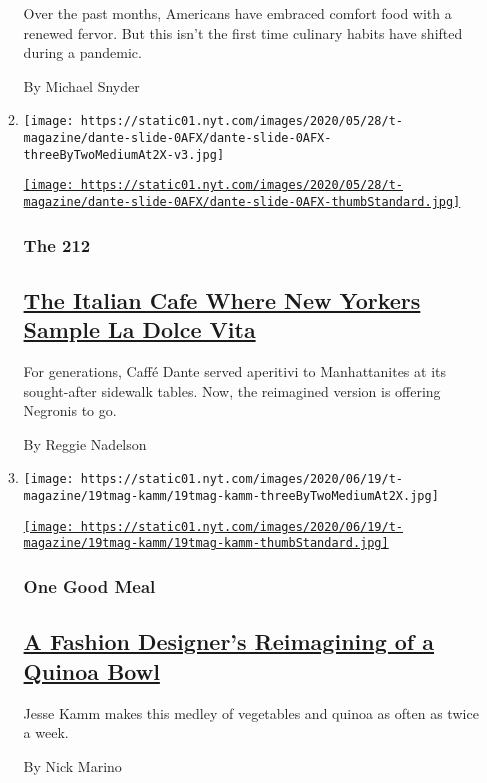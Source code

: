 \begin{enumerate}
\begin{enumerate}
    Over the past months, Americans have embraced comfort food with a
    renewed fervor. But this isn't the first time culinary habits have
    shifted during a pandemic.

    By Michael Snyder
  \item
    \texttt{[image: https://static01.nyt.com/images/2020/05/28/t-magazine/dante-slide-0AFX/dante-slide-0AFX-threeByTwoMediumAt2X-v3.jpg]}

    \href{/2020/06/12/t-magazine/caffe-dante-nyc.html}{\texttt{[image: https://static01.nyt.com/images/2020/05/28/t-magazine/dante-slide-0AFX/dante-slide-0AFX-thumbStandard.jpg]}}

    \hypertarget{the-212}{%
    \subsubsection{The 212}\label{the-212}}

    \hypertarget{the-italian-cafe-where-new-yorkers-sample-la-dolce-vita}{%
    \subsection{\texorpdfstring{\href{/2020/06/12/t-magazine/caffe-dante-nyc.html}{The
    Italian Cafe Where New Yorkers Sample La Dolce
    Vita}}{The Italian Cafe Where New Yorkers Sample La Dolce Vita}}\label{the-italian-cafe-where-new-yorkers-sample-la-dolce-vita}}

    For generations, Caffé Dante served aperitivi to Manhattanites at
    its sought-after sidewalk tables. Now, the reimagined version is
    offering Negronis to go.

    By Reggie Nadelson
  \item
    \texttt{[image: https://static01.nyt.com/images/2020/06/19/t-magazine/19tmag-kamm/19tmag-kamm-threeByTwoMediumAt2X.jpg]}

    \href{/2020/06/26/t-magazine/jesse-kamm-quinoa-bowl-recipe.html}{\texttt{[image: https://static01.nyt.com/images/2020/06/19/t-magazine/19tmag-kamm/19tmag-kamm-thumbStandard.jpg]}}

    \hypertarget{one-good-meal-1}{%
    \subsubsection{One Good Meal}\label{one-good-meal-1}}

    \hypertarget{a-fashion-designers-reimagining-of-a-quinoa-bowl}{%
    \subsection{\texorpdfstring{\href{/2020/06/26/t-magazine/jesse-kamm-quinoa-bowl-recipe.html}{A
    Fashion Designer's Reimagining of a Quinoa
    Bowl}}{A Fashion Designer's Reimagining of a Quinoa Bowl}}\label{a-fashion-designers-reimagining-of-a-quinoa-bowl}}

    Jesse Kamm makes this medley of vegetables and quinoa as often as
    twice a week.

    By Nick Marino
  \end{enumerate}
\end{enumerate}

